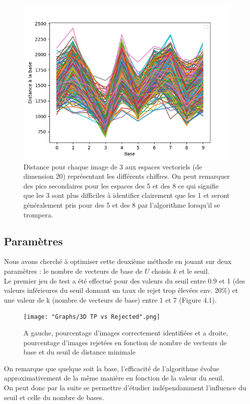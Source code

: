 \documentclass[a4paper,11pt,twoside]{report}
\begin{document}
\begin{figure}[H]
\begin{center}

  	\includegraphics[width=0.7\linewidth]{Graphs/Distance_bases_20_3.png}
  	\caption{Distance pour chaque image de 3 aux espaces vectoriels (de dimension 20) représentant les différents chiffres. On peut remarquer des pics secondaires pour les espaces des 5 et des 8 ce qui signifie que les 3 sont plus difficiles à identifier clairement que les 1 et seront généralement pris pour des 5 et des 8 par l'algorithme lorsqu'il se trompera.}
\end{center}
\end{figure}


\subsection{Paramètres}
Nous avons cherché à optimiser cette deuxième méthode en jouant sur deux paramètres : le nombre de vecteurs de base de $U$ choisis $k$ et le seuil.\\

Le premier jeu de test a été effectué pour des valeurs du seuil entre 0.9 et 1 (des valeurs inférieures du seuil donnant un taux de rejet trop élevées env. 20\%) et une valeur de k (nombre de vecteurs de base) entre 1 et 7 (Figure 4.1).\\

\begin{figure}[H]
  	\texttt{[image: "Graphs/3D TP vs Rejected".png]}
  	\caption{A gauche, pourcentage d'images correctement identifiées et a droite, pourcentage d'images rejetées en fonction de nombre de vecteurs de base et du seuil de distance minimale}
\end{figure}

On remarque que quelque soit la base, l'efficacité de l'algorithme évolue approximativement de la même manière en fonction de la valeur du seuil. \\ 
On peut donc par la suite se permettre d'étudier indépendamment l'influence du seuil et celle du nombre de bases.\\
\end{document}
